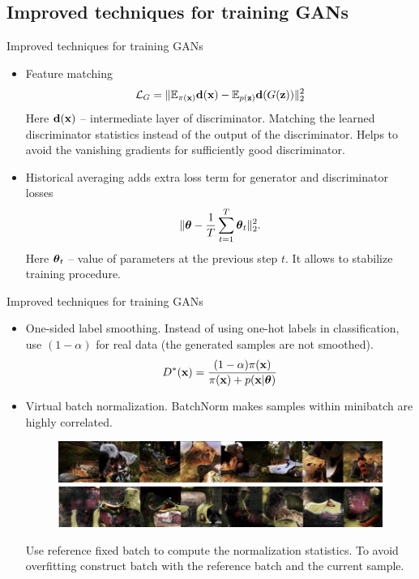 \subsection{Improved techniques for training GANs}
\begin{frame}{Improved techniques for training GANs}
	\begin{itemize}
		\item Feature matching
		\[
			\mathcal{L}_G = \| \mathbb{E}_{\pi(\mathbf{x})} \mathbf{d}(\mathbf{x}) - \mathbb{E}_{p(\mathbf{z})} \mathbf{d}(G(\mathbf{z})) \|_2^2
		\]
		Here $\mathbf{d}(\mathbf{x})$ -- intermediate layer of discriminator. Matching the learned discriminator statistics instead of the output of the discriminator. Helps to avoid the vanishing gradients for sufficiently good discriminator.
		\item Historical averaging adds extra loss term for generator and discriminator losses
		\vspace{-0.2cm}
		\[
		 \| \boldsymbol{\theta} - \frac{1}{T}\sum_{t=1}^T \boldsymbol{\theta}_t\|^2_2.
		\]
		Here $\boldsymbol{\theta}_t$ -- value of parameters at the previous step $t$. It allows to stabilize training procedure.
	\end{itemize}
\end{frame}
\begin{frame}{Improved techniques for training GANs}
	\begin{itemize}
		\item One-sided label smoothing. Instead of using one-hot labels in classification, use $(1 - \alpha)$ for real data (the generated samples are not smoothed).
		\[
			D^*(\mathbf{x}) = \frac{(1 - \alpha )\pi(\mathbf{x})}{\pi(\mathbf{x}) + p(\mathbf{x} | \boldsymbol{\theta})}
		\]
		\item Virtual batch normalization. BatchNorm makes samples within minibatch are highly correlated.
		\begin{figure}
			\centering
			\includegraphics[width=0.6\linewidth]{figs/virtual_batch_norm}
		\end{figure}
	Use reference fixed batch to compute the normalization statistics. To avoid overfitting construct batch with the reference batch and the current sample. 
	\end{itemize}
\end{frame}
